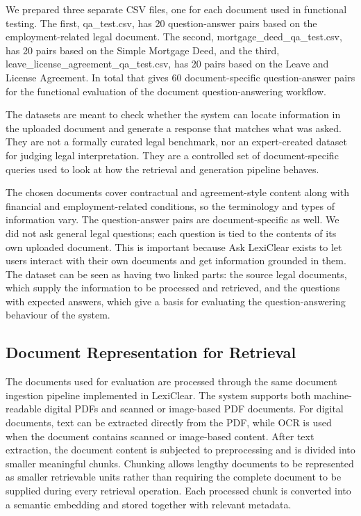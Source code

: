 \documentclass[12pt,a4paper,oneside]{report}
\begin{document}
We prepared three separate CSV files, one for each document used in functional testing. The first, qa\_test.csv, has 20 question-answer pairs based on the employment-related legal document. The second, mortgage\_deed\_qa\_test.csv, has 20 pairs based on the Simple Mortgage Deed, and the third, leave\_license\_agreement\_qa\_test.csv, has 20 pairs based on the Leave and License Agreement. In total that gives 60 document-specific question-answer pairs for the functional evaluation of the document question-answering workflow.

The datasets are meant to check whether the system can locate information in the uploaded document and generate a response that matches what was asked. They are not a formally curated legal benchmark, nor an expert-created dataset for judging legal interpretation. They are a controlled set of document-specific queries used to look at how the retrieval and generation pipeline behaves.

The chosen documents cover contractual and agreement-style content along with financial and employment-related conditions, so the terminology and types of information vary. The question-answer pairs are document-specific as well. We did not ask general legal questions; each question is tied to the contents of its own uploaded document. This is important because Ask LexiClear exists to let users interact with their own documents and get information grounded in them. The dataset can be seen as having two linked parts: the source legal documents, which supply the information to be processed and retrieved, and the questions with expected answers, which give a basis for evaluating the question-answering behaviour of the system.

\subsection{Document Representation for Retrieval}

The documents used for evaluation are processed through the same document
ingestion pipeline implemented in LexiClear. The system supports both
machine-readable digital PDFs and scanned or image-based PDF documents. For
digital documents, text can be extracted directly from the PDF, while OCR is
used when the document contains scanned or image-based content. After text extraction, the document content is subjected to preprocessing and
is divided into smaller meaningful chunks. Chunking allows lengthy documents
to be represented as smaller retrievable units rather than requiring the
complete document to be supplied during every retrieval operation. Each
processed chunk is converted into a semantic embedding and stored together
with relevant metadata.
\end{document}
